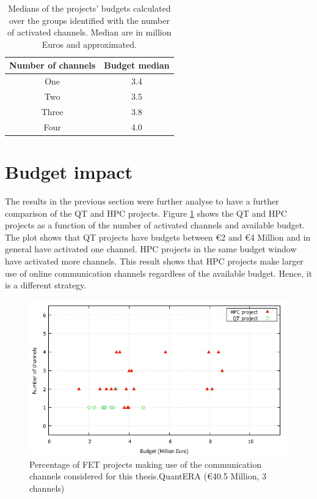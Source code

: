 \begin{table}[t]
 \begin{center}
  \begin{tabular}{cc}
   \hline 
   \hline
   Number of channels & Budget median \\ 
   \hline
   \hline
   One & 3.4 \\
   Two & 3.5 \\
   Three & 3.8 \\
   Four & 4.0 \\
   \hline
   \hline
  \end{tabular}
 \end{center} 
 \caption{Medians of the projects' budgets calculated over the groups identified with the number of activated channels. Median are in million Euros and approximated.}
\label{Median} 
\end{table}

\section{Budget impact}
The results in the previous section were further analyse to have a further comparison of the QT and HPC projects. Figure \ref{Channel_budget_breakdown} shows the QT and HPC projects as a function of the number of activated channels and available budget. The plot shows that QT projects have budgets between \euro 2 and \euro 4 Million and in general have activated one channel. HPC projects in the same budget window have activated more channels. This result shows that HPC projects make larger use of online communication channels regardless of the available budget. Hence, it is a different strategy.  
 

\begin{figure}[!t] 
 \begin{center}
 \includegraphics[scale=0.4]{Images/Channel_budget_breakdown.png}
 \caption{Percentage of FET projects making use of the communication channels considered for this thesis.QuantERA (\euro 40.5 Million, 3 channels)}
 \label{Channel_budget_breakdown}
 \end{center}
\end{figure}